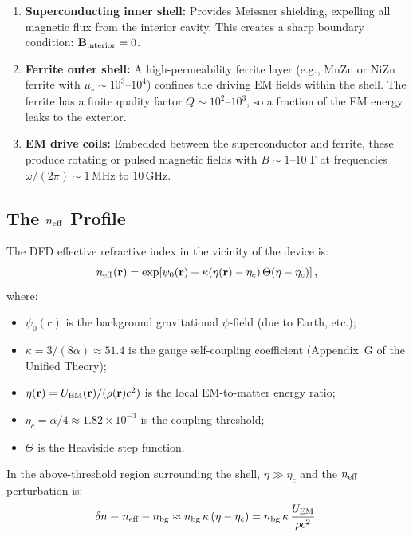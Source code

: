 \documentclass[11pt]{article}
\newcommand{\etac}{\eta_c}
\newcommand{\neff}{n_{\rm eff}}
\begin{document}
\begin{enumerate}[noitemsep]
\item \textbf{Superconducting inner shell:} Provides Meissner shielding,
  expelling all magnetic flux from the interior cavity. This creates a sharp
  boundary condition: $\mathbf{B}_{\rm interior} = 0$.

\item \textbf{Ferrite outer shell:} A high-permeability ferrite layer
  (e.g., MnZn or NiZn ferrite with $\mu_r \sim 10^3$--$10^4$) confines
  the driving EM fields within the shell. The ferrite has a finite
  quality factor $Q \sim 10^2$--$10^3$, so a fraction of the EM energy
  leaks to the exterior.

\item \textbf{EM drive coils:} Embedded between the superconductor and
  ferrite, these produce rotating or pulsed magnetic fields with
  $B \sim 1$--$10$\,T at frequencies $\omega/(2\pi) \sim 1$\,MHz to
  $10$\,GHz.
\end{enumerate}

\subsection{The $\neff$ Profile}

The DFD effective refractive index in the vicinity of the device is:
\begin{equation}\label{eq:neff}
\neff(\mathbf{r}) = \exp\!\left[\psi_0(\mathbf{r})
  + \kappa(\eta(\mathbf{r}) - \etac)\,\Theta(\eta - \etac)\right],
\end{equation}
where:
\begin{itemize}[noitemsep]
\item $\psi_0(\mathbf{r})$ is the background gravitational $\psi$-field
  (due to Earth, etc.);
\item $\kappa = 3/(8\alpha) \approx 51.4$ is the gauge self-coupling
  coefficient (Appendix~G of the Unified Theory);
\item $\eta(\mathbf{r}) = U_{\rm EM}(\mathbf{r})/(\rho(\mathbf{r}) c^2)$
  is the local EM-to-matter energy ratio;
\item $\etac = \alpha/4 \approx 1.82 \times 10^{-3}$ is the coupling
  threshold;
\item $\Theta$ is the Heaviside step function.
\end{itemize}

In the above-threshold region surrounding the shell, $\eta \gg \etac$ and
the $\neff$ perturbation is:
\begin{equation}\label{eq:delta-n}
\delta n \equiv \neff - n_{\rm bg}
  \approx n_{\rm bg}\,\kappa\,(\eta - \etac)
  = n_{\rm bg}\,\kappa\,\frac{U_{\rm EM}}{\rho c^2}.
\end{equation}
\end{document}
